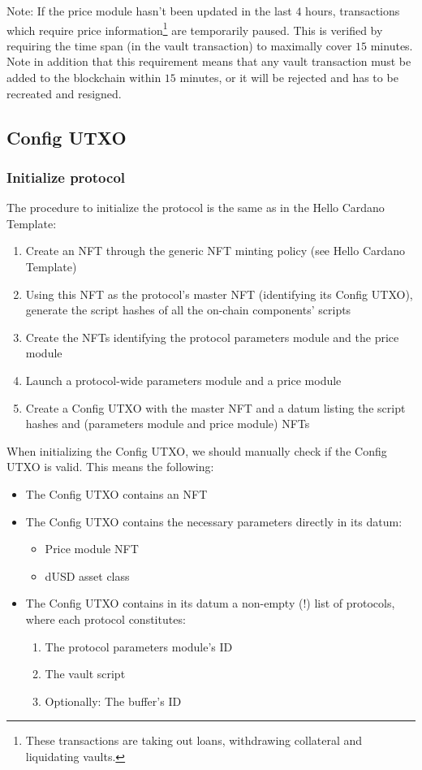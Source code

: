 \documentclass{article} %
\begin{document}

Note: If the price module hasn't been updated in the last $4$ hours,
transactions which require price information\footnote{
  These transactions are taking out loans, withdrawing collateral and
  liquidating vaults.
} are temporarily paused. This is verified by requiring the time span (in the
vault transaction) to maximally cover $15$ minutes. Note in addition that this
requirement means that any vault transaction must be added to the blockchain
within $15$ minutes, or it will be rejected and has to be recreated and
resigned.

\subsection{Config UTXO}

\subsubsection*{Initialize protocol}

The procedure to initialize the protocol is the same as in the Hello Cardano
Template:
\begin{enumerate}
  \item Create an NFT through the generic NFT minting policy (see Hello Cardano
    Template)
  \item Using this NFT as the protocol's master NFT (identifying its Config
    UTXO), generate the script hashes of all the on-chain components' scripts
  \item Create the NFTs identifying the protocol parameters module and the price
    module
  \item Launch a protocol-wide parameters module and a price module
  \item Create a Config UTXO with the master NFT and a datum listing the script
    hashes and (parameters module and price module) NFTs
\end{enumerate}

When initializing the Config UTXO, we should manually check if the Config UTXO
is valid. This means the following:
\begin{itemize}
  \item The Config UTXO contains an NFT
  \item The Config UTXO contains the necessary parameters directly in its datum:
    \begin{itemize}
      \item Price module NFT
      \item dUSD asset class
    \end{itemize}
  \item The Config UTXO contains in its datum a non-empty (!) list of protocols,
    where each protocol constitutes:
    \begin{enumerate}
      \item The protocol parameters module's ID
      \item The vault script
      \item Optionally: The buffer's ID
    \end{enumerate}
\end{itemize}
\end{document}
